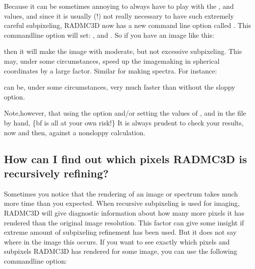 \documentclass[letterpaper,10pt,english]{sphinxmanual}
\begin{document}
 Because it can be sometimes annoying to always have to
play with the ,  and
 values, and since it is usually (!) not really
necessary to have such extremely careful subpixeling, RADMC\sphinxhyphen{}3D now has a new
command line option called . This command\sphinxhyphen{}line option will set:
,  and
. So if you have an image like this:

\begin{sphinxVerbatim}[commandchars=\\\{\}]
        
\end{sphinxVerbatim}

then it will make the image with moderate, but not excessive subpixeling.
This may, under some circumstances, speed up the image\sphinxhyphen{}making in spherical
coordinates by a large factor. Similar for making spectra. For instance:

\begin{sphinxVerbatim}[commandchars=\\\{\}]
      
\end{sphinxVerbatim}

can be, under some circumstances, very much faster than without the sloppy
option.

Note,however, that using the  option and/or setting the values of
,  and  in
the  file by hand, \{bf is all at your own risk!\} It is always
prudent to check your results, now and then, against a non\sphinxhyphen{}sloppy calculation.


\subsection{How can I find out which pixels RADMC\sphinxhyphen{}3D is recursively refining?}
\label{\detokenize{imagesspectra:how-can-i-find-out-which-pixels-radmc-3d-is-recursively-refining}}
Sometimes you notice that the rendering of an image or spectrum takes much
more time than you expected. When recursive sub\sphinxhyphen{}pixeling is used for
imaging, RADMC\sphinxhyphen{}3D will give diagnostic information about how many more
pixels it has rendered than the original image resolution. This factor
can give some insight if extreme amount of sub\sphinxhyphen{}pixeling refinement has
been used. But it does not say where in the image this occurs. If you want
to see exactly which pixels and subpixels RADMC\sphinxhyphen{}3D has rendered for some
image, you can use the following command\sphinxhyphen{}line option:
\end{document}
